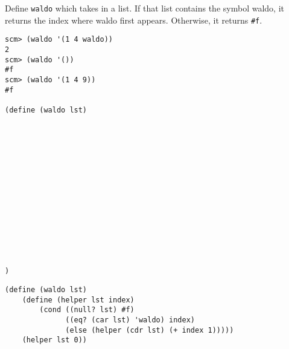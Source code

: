 \begin{comment}
\begin{blocksection}
\question Implement \texttt{waldo}. \texttt{waldo} returns \texttt{\#t} if the
symbol waldo is in a list. You may assume that the list passed in is
well-formed.\\

\begin{lstlisting}
scm> (waldo '(1 4 waldo))
#t
scm> (waldo '())
#f
scm> (waldo '(1 4 9))
#f

(define (waldo lst)














)
\end{lstlisting}

\begin{solution}
\begin{lstlisting}
(define (waldo lst)
    (cond ((null? lst) #f)
          ((eq? (car lst) 'waldo) #t)
          (else (waldo (cdr lst)))
      )
  )
\end{lstlisting}
\end{solution}
\end{blocksection}
\end{comment}

\begin{blocksection}
\question Define \texttt{waldo} which takes in a list. If that list contains the
symbol waldo, it returns the index where waldo first appears. Otherwise, it
returns \texttt{\#f}.
\begin{lstlisting}
scm> (waldo '(1 4 waldo))
2
scm> (waldo '())
#f
scm> (waldo '(1 4 9))
#f

(define (waldo lst)















)
\end{lstlisting}

\begin{solution}[0.5in]
\begin{lstlisting}
(define (waldo lst)
    (define (helper lst index)
        (cond ((null? lst) #f)
              ((eq? (car lst) 'waldo) index)
              (else (helper (cdr lst) (+ index 1)))))
    (helper lst 0))
\end{lstlisting}
\end{solution}
\end{blocksection}